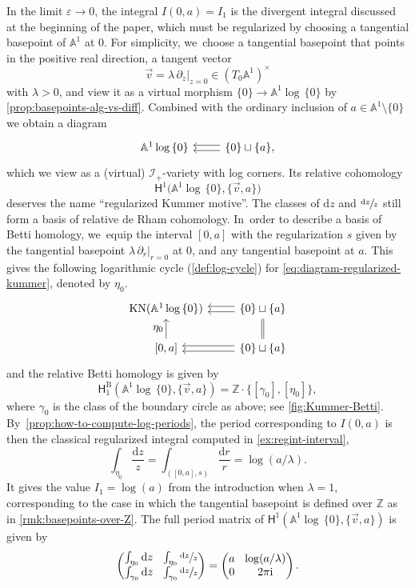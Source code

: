 \documentclass[JEP,XML,SOM,Unicode,NoFloatCountersInSection,published]{cedram}
\let\oldbullet\bullet
\renewcommand{\bullet}{{\raisebox{1pt}{$\scriptscriptstyle\oldbullet$}}}
\let\tst\textstyle
\newcommand{\rbirac}[1]{\bigl(#1\bigr)}
\newcommand{\cbirac}[1]{\bigl\{#1\bigr\}}
\newcommand{\bcoH}[2][\bullet]{\mathsf{H}^{#1}\rbirac{#2}}
\newcommand{\dslog}[1]{\sfrac{\dd#1}{#1}}
\theoremstyle{definition}
\theoremstyle{remark}
\newcommand{\ZZ}{\mathbb{Z}}
\newcommand{\AF}{\mathbb{A}}
\newcommand{\logcyl}{\AF^1 \log\, \{0\}}
\newcommand{\iu}{\mathrm{i}}
\newcommand{\ipi}{\pi\iu }
\newcommand{\tipi}{2\ipi}
\let\epsilon\varepsilon
\newcommand{\rbrac}[1]{\left(#1\right)}
\newcommand{\dd}{\mathrm{d}}
\newcommand{\dlog}[1]{\frac{\dd#1}{#1}}
\newcommand{\cvf}[1]{\partial_{#1}}
\newcommand{\tb}[2][]{T_{#1}#2}
\newcommand{\KN}[1]{\mathrm{KN}(#1)}
\newcommand{\coH}[2][\bullet]{\mathsf{H}^{#1}\rbrac{#2}}
\newcommand{\HlgyB}[2][\bullet]{\mathsf{H}^{\mathrm{B}}_{#1}(#2)}
\newcommand{\ascat}{\mathscr{I}_+}
\begin{document}
In the limit $\epsilon \to 0$, the integral $I(0,a)=I_1$ is the divergent integral discussed at the beginning of the paper, which must be regularized by choosing a tangential basepoint of $\AF^1$ at $0$. For simplicity, we~choose a tangential basepoint that points in the positive real direction, \ie a tangent vector
\[
\vec{v} = \lambda \, \cvf{z}|_{z=0} \in (\tb[0]{\AF^1})^\times
\]
with $\lambda > 0$, and view it as a virtual morphism $\{0\}\to \logcyl$ by \autoref{prop:basepoints-alg-vs-diff}. Combined with the ordinary inclusion of $a \in \AF^1 \setminus \{0\}$ we obtain a diagram
\begin{equation}\label{eq:diagram-regularized-kummer}
\begin{tikzcd}
\logcyl & \{0\} \sqcup \{a\} \ar[l,shift right] \ar[l,shift left],
\end{tikzcd}
\end{equation}
which we view as a (virtual) $\ascat$-variety with log corners. Its relative cohomology
\[
\bcoH[1]{\logcyl,\{\vec{v},a\}}
\]
deserves the name ``regularized Kummer motive''.
The classes of $\dd z$ and $\dslog{z}$ still form a basis of relative de Rham cohomology. In~order to describe a basis of Betti homology, we~equip the interval $[0,a]$ with the regularization $s$ given by the tangential basepoint $\lambda \, \cvf{r}|_{r=0}$ at $0$, and any tangential basepoint at $a$. This gives the following logarithmic cycle (\autoref{def:log-cycle}) for \eqref{eq:diagram-regularized-kummer}, denoted by $\eta_0$.
\[
\begin{tikzcd}
\KN{\logcyl} & \{0\} \sqcup \{a\} \ar[l,shift right] \ar[l,shift left] \\
{[0,a]} \ar[u,"\tst \eta_0"] & \{0\} \sqcup \{a\} \ar[u,equal] \ar[l,shift right] \ar[l,shift left]
\end{tikzcd}
\]
and the relative Betti homology is given by
\[
\HlgyB[1]{\logcyl,\{\vec{v},a\}} = \ZZ \cdot \cbirac{[\gamma_0],[\eta_0]},
\]
where $\gamma_0$ is the class of the boundary circle as above; see \autoref{fig:Kummer-Betti}. By~\autoref{prop:how-to-compute-log-periods}, the period corresponding to $I(0,a)$ is then the classical regularized integral computed in \autoref{ex:regint-interval},
\[
\int_{\eta_0}\dlog{z} = \int_{([0,a],s)}\dlog{r} = \log(a/\lambda).
\]
It gives the value $I_1 = \log(a)$ from the introduction when $\lambda=1$, corresponding to the case in which the tangential basepoint is defined over $\ZZ$ as in \autoref{rmk:basepoints-over-Z}. The full period matrix of $\coH[1]{\logcyl,\{\vec{v},a\}}$ is given by
\[\arraycolsep4.5pt
\begin{pmatrix}
\int_{\eta_0} \dd z & \int_{\eta_0} \dslog{z} \\
\int_{\gamma_0} \dd z & \int_{\gamma_0} \dslog{z}
\end{pmatrix} = \begin{pmatrix}
a & \log(a/\lambda)\\
0 & \tipi
\end{pmatrix}.
\]
\end{document}
